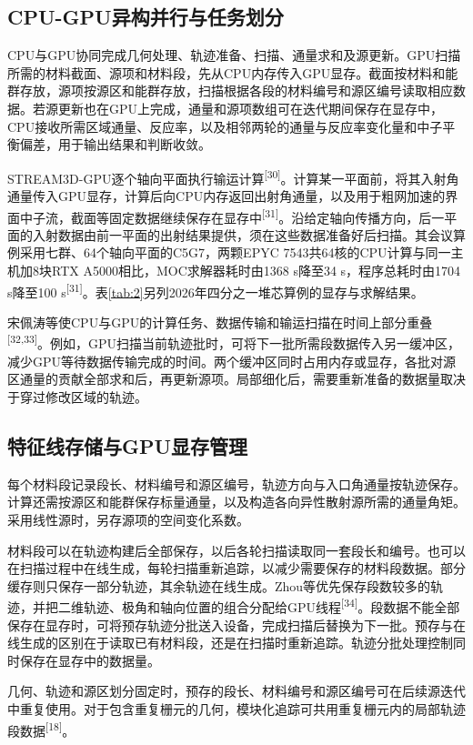 \documentclass[UTF8, zihao=-4, fontset=none, a4paper]{ctexart}
\newcommand{\upcite}[1]{\textsuperscript{[#1]}}
\begin{document}
\subsection{CPU-GPU异构并行与任务划分}

CPU与GPU协同完成几何处理、轨迹准备、扫描、通量求和及源更新。GPU扫描所需的材料截面、源项和材料段，先从CPU内存传入GPU显存。截面按材料和能群存放，源项按源区和能群存放，扫描根据各段的材料编号和源区编号读取相应数据。若源更新也在GPU上完成，通量和源项数组可在迭代期间保存在显存中，CPU接收所需区域通量、反应率，以及相邻两轮的通量与反应率变化量和中子平衡偏差，用于输出结果和判断收敛。

STREAM3D-GPU逐个轴向平面执行输运计算\upcite{30}。计算某一平面前，将其入射角通量传入GPU显存，计算后向CPU内存返回出射角通量，以及用于粗网加速的界面中子流，截面等固定数据继续保存在显存中\upcite{31}。沿给定轴向传播方向，后一平面的入射数据由前一平面的出射结果提供，须在这些数据准备好后扫描。其会议算例采用七群、64个轴向平面的C5G7，两颗EPYC 7543共64核的CPU计算与同一主机加8块RTX A5000相比，MOC求解器耗时由1368 s降至34 s，程序总耗时由1704 s降至100 s\upcite{31}。表\ref{tab:2}另列2026年四分之一堆芯算例的显存与求解结果。

宋佩涛等使CPU与GPU的计算任务、数据传输和输运扫描在时间上部分重叠\upcite{32,33}。例如，GPU扫描当前轨迹批时，可将下一批所需段数据传入另一缓冲区，减少GPU等待数据传输完成的时间。两个缓冲区同时占用内存或显存，各批对源区通量的贡献全部求和后，再更新源项。局部细化后，需要重新准备的数据量取决于穿过修改区域的轨迹。

\subsection{特征线存储与GPU显存管理}

每个材料段记录段长、材料编号和源区编号，轨迹方向与入口角通量按轨迹保存。计算还需按源区和能群保存标量通量，以及构造各向异性散射源所需的通量角矩。采用线性源时，另存源项的空间变化系数。

材料段可以在轨迹构建后全部保存，以后各轮扫描读取同一套段长和编号。也可以在扫描过程中在线生成，每轮扫描重新追踪，以减少需要保存的材料段数据。部分缓存则只保存一部分轨迹，其余轨迹在线生成。Zhou等优先保存段数较多的轨迹，并把二维轨迹、极角和轴向位置的组合分配给GPU线程\upcite{34}。段数据不能全部保存在显存时，可将预存轨迹分批送入设备，完成扫描后替换为下一批。预存与在线生成的区别在于读取已有材料段，还是在扫描时重新追踪。轨迹分批处理控制同时保存在显存中的数据量。

几何、轨迹和源区划分固定时，预存的段长、材料编号和源区编号可在后续源迭代中重复使用。对于包含重复栅元的几何，模块化追踪可共用重复栅元内的局部轨迹段数据\upcite{18}。
\end{document}
